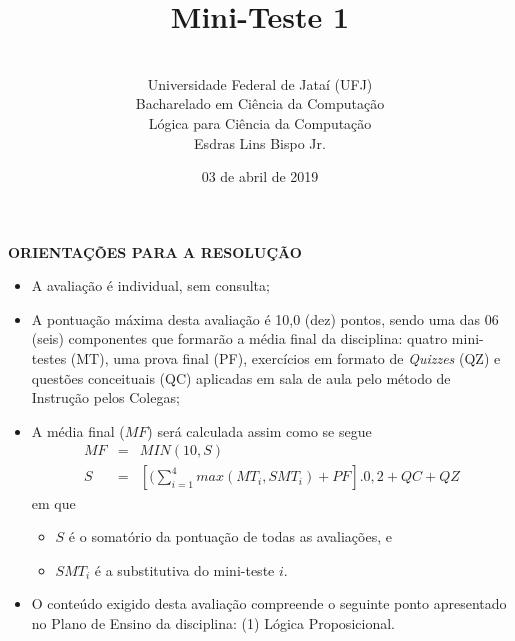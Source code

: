 \documentclass[12pt,a4paper,oneside]{article}
\author{\\Universidade Federal de Jataí (UFJ)\\Bacharelado em Ciência da Computação \\Lógica para Ciência da Computação \\Esdras Lins Bispo Jr.}
\date{03 de abril de 2019}
\title{\sc \huge Mini-Teste 1}
\begin{document}
\maketitle

{\bf ORIENTAÇÕES PARA A RESOLUÇÃO}

\small
 
\begin{itemize}
	\item A avaliação é individual, sem consulta;
	\item A pontuação máxima desta avaliação é 10,0 (dez) pontos, sendo uma das 06 (seis) componentes que formarão a média final da disciplina: quatro mini-testes (MT), uma prova final (PF), exercícios em formato de {\it Quizzes} (QZ) e questões conceituais (QC) aplicadas em sala de aula pelo método de Instrução pelos Colegas;
	\item A média final ($MF$) será calculada assim como se segue
	\begin{eqnarray}
		MF & = & MIN(10, S) \nonumber \\
		S & = & [(\sum_{i=1}^{4} max(MT_i, SMT_i ) + PF].0,2  + QC + QZ\nonumber
	\end{eqnarray}
	em que 
	\begin{itemize}
		\item $S$ é o somatório da pontuação de todas as avaliações, e
		\item $SMT_i$ é a substitutiva do mini-teste $i$.
	\end{itemize}
	\item O conteúdo exigido desta avaliação compreende o seguinte ponto apresentado no Plano de Ensino da disciplina: (1) Lógica Proposicional.
\end{itemize}

\begin{center}
\end{center}

\newpage
\end{document}

